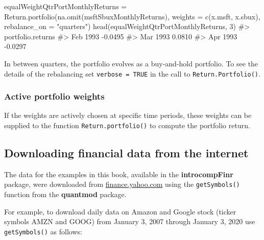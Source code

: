 \documentclass[
  letterpaper,
  DIV=11,
  numbers=noendperiod]{scrreprt}
\newenvironment{Shaded}{\begin{snugshade}}{\end{snugshade}}
\newcommand{\AttributeTok}[1]{\textcolor[rgb]{0.40,0.45,0.13}{#1}}
\newcommand{\CommentTok}[1]{\textcolor[rgb]{0.37,0.37,0.37}{#1}}
\newcommand{\DecValTok}[1]{\textcolor[rgb]{0.68,0.00,0.00}{#1}}
\newcommand{\FunctionTok}[1]{\textcolor[rgb]{0.28,0.35,0.67}{#1}}
\newcommand{\NormalTok}[1]{\textcolor[rgb]{0.00,0.23,0.31}{#1}}
\newcommand{\OtherTok}[1]{\textcolor[rgb]{0.00,0.23,0.31}{#1}}
\newcommand{\StringTok}[1]{\textcolor[rgb]{0.13,0.47,0.30}{#1}}
\theoremstyle{definition}
\theoremstyle{definition}
\theoremstyle{remark}
\begin{document}
\begin{Shaded}
\begin{Highlighting}[]
\NormalTok{equalWeightQtrPortMonthlyReturns }\OtherTok{=} 
  \FunctionTok{Return.portfolio}\NormalTok{(}\FunctionTok{na.omit}\NormalTok{(msftSbuxMonthlyReturns),}
                   \AttributeTok{weights =} \FunctionTok{c}\NormalTok{(x.msft, x.sbux),}
                   \AttributeTok{rebalance\_on =} \StringTok{"quarters"}\NormalTok{)}
\FunctionTok{head}\NormalTok{(equalWeightQtrPortMonthlyReturns, }\DecValTok{3}\NormalTok{)}
\CommentTok{\#\textgreater{}          portfolio.returns}
\CommentTok{\#\textgreater{} Feb 1993           {-}0.0495}
\CommentTok{\#\textgreater{} Mar 1993            0.0810}
\CommentTok{\#\textgreater{} Apr 1993           {-}0.0297}
\end{Highlighting}
\end{Shaded}

In between quarters, the portfolio evolves as a buy-and-hold portfolio.
To see the details of the rebalancing set \texttt{verbose\ =\ TRUE} in
the call to \texttt{Return.Portfolio()}.

\hypertarget{active-portfolio-weights}{%
\subsubsection{Active portfolio
weights}\label{active-portfolio-weights}}

If the weights are actively chosen at specific time periods, these
weights can be supplied to the function \texttt{Return.portfolio()} to
compute the portfolio return.

\hypertarget{downloading-financial-data-from-the-internet}{%
\subsection{Downloading financial data from the
internet}\label{downloading-financial-data-from-the-internet}}

The data for the examples in this book, available in the
\textbf{introcompFinr} package, were downloaded from
\href{https://finance.yahoo.com/}{finance.yahoo.com} using the
\texttt{getSymbols()} function from the 
\textbf{quantmod} package.

For example, to download daily data on Amazon and Google stock (ticker
symbols AMZN and GOOG) from January 3, 2007 through January 3, 2020 use
\texttt{getSymbols()} as follows:
\end{document}
